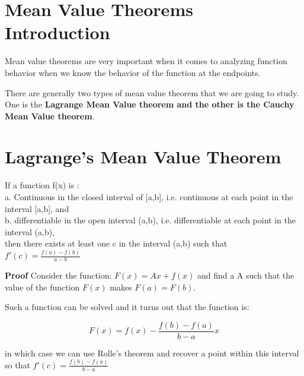 \section{Mean Value Theorems Introduction}

Mean value theorems are very important when it comes to analyzing function behavior when we know the behavior of the function at the endpoints. 

There are generally two types of mean value theorem that we are going to study. One is the \textbf{Lagrange Mean Value theorem and the other is the Cauchy Mean Value theorem}.

\section{Lagrange's Mean Value Theorem}

\begin{outline}
    If a function f(x) is :
    \\
    a. Continuous in the closed interval of [a,b], i.e. continuous at each point in the interval [a,b], and
    \\
    b. differentiable in the open interval (a,b), i.e. differentiable at each point in the interval (a,b), 
    \\
    then there exists at least one c in the interval (a,b) such that $f'(c)=\frac{f(a)-f(b)}{a-b}$
\end{outline}


\textbf{Proof}
Consider the function:
$F(x)=Ax+f(x)$
and find a A such that the value of the function $F(x)$
makes $F(a)=F(b)$.

Such a function can be solved and it turns out that the function is:

$$F(x) = f(x) -\frac{f(b)-f(a)}{b-a}x $$

in which case we can use Rolle's theorem and recover a point within this interval so that $f'(c)=\frac{f(b)-f(a)}{b-a}$

